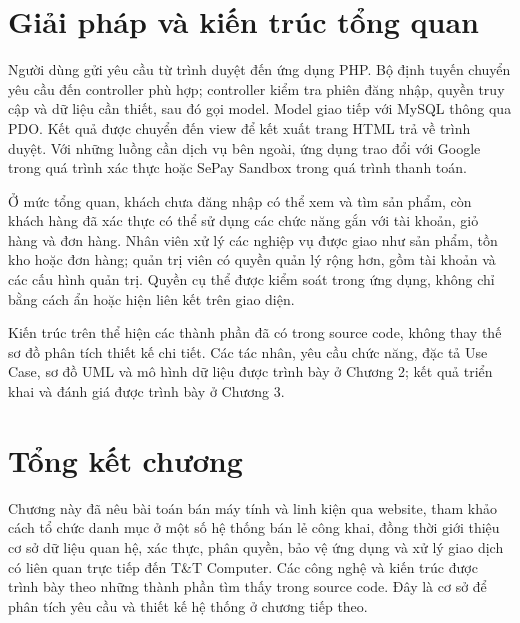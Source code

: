 \section{Giải pháp và kiến trúc tổng quan}
Người dùng gửi yêu cầu từ trình duyệt đến ứng dụng PHP. Bộ định tuyến chuyển yêu cầu đến controller phù hợp; controller kiểm tra phiên đăng nhập, quyền truy cập và dữ liệu cần thiết, sau đó gọi model. Model giao tiếp với MySQL thông qua PDO. Kết quả được chuyển đến view để kết xuất trang HTML trả về trình duyệt. Với những luồng cần dịch vụ bên ngoài, ứng dụng trao đổi với Google trong quá trình xác thực hoặc SePay Sandbox trong quá trình thanh toán.

Ở mức tổng quan, khách chưa đăng nhập có thể xem và tìm sản phẩm, còn khách hàng đã xác thực có thể sử dụng các chức năng gắn với tài khoản, giỏ hàng và đơn hàng. Nhân viên xử lý các nghiệp vụ được giao như sản phẩm, tồn kho hoặc đơn hàng; quản trị viên có quyền quản lý rộng hơn, gồm tài khoản và các cấu hình quản trị. Quyền cụ thể được kiểm soát trong ứng dụng, không chỉ bằng cách ẩn hoặc hiện liên kết trên giao diện.

Kiến trúc trên thể hiện các thành phần đã có trong source code, không thay thế sơ đồ phân tích thiết kế chi tiết. Các tác nhân, yêu cầu chức năng, đặc tả Use Case, sơ đồ UML và mô hình dữ liệu được trình bày ở Chương 2; kết quả triển khai và đánh giá được trình bày ở Chương 3.

\section{Tổng kết chương}
Chương này đã nêu bài toán bán máy tính và linh kiện qua website, tham khảo cách tổ chức danh mục ở một số hệ thống bán lẻ công khai, đồng thời giới thiệu cơ sở dữ liệu quan hệ, xác thực, phân quyền, bảo vệ ứng dụng và xử lý giao dịch có liên quan trực tiếp đến T\&T Computer. Các công nghệ và kiến trúc được trình bày theo những thành phần tìm thấy trong source code. Đây là cơ sở để phân tích yêu cầu và thiết kế hệ thống ở chương tiếp theo.
